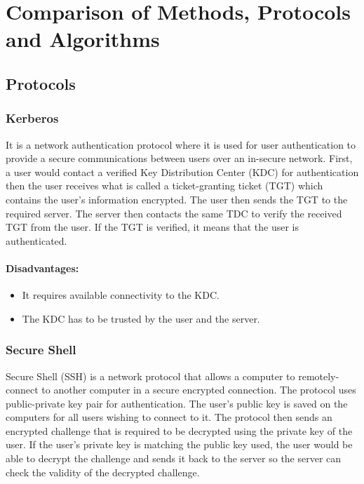 \chapter{Comparison of Methods, Protocols and Algorithms}

\section{Protocols}

\subsection{Kerberos}
It is a network authentication protocol where it is used for user authentication to provide a secure communications between users over an in-secure network. First, a user would contact a verified Key Distribution Center (KDC) for authentication then the user receives what is called a ticket-granting ticket (TGT) which contains the user's information encrypted. The user then sends the TGT to the required server. The server then contacts the same TDC to verify the received TGT from the user. If the TGT is verified, it means that the user is authenticated.

\subsubsection{Disadvantages:}
\begin{itemize}
    \item It requires available connectivity to the KDC.
    \item The KDC has to be trusted by the user and the server.
\end{itemize}

\subsection{Secure Shell}
Secure Shell (SSH) is a network protocol that allows a computer to remotely-connect to another computer in a secure encrypted connection. The protocol uses public-private key pair for authentication. The user's public key is saved on the computers for all users wishing to connect to it. The protocol then sends an encrypted challenge that is required to be decrypted using the private key of the user. If the user's private key is matching the public key used, the user would be able to decrypt the challenge and sends it back to the server so the server can check the validity of the decrypted challenge.


